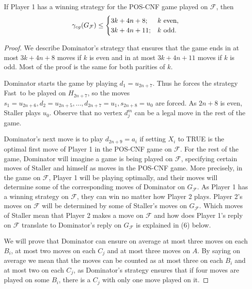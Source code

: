 \documentclass[10pt,a4paper]{amsart}
\newcommand{\F}{\mathcal{F}}
\newcommand{\fast}{{\sc Fast}}
\newcommand{\gcg}{\gamma_{\rm cg}}
\begin{document}
\begin{lemma}
	\label{lem:p1-wins}
	If Player 1 has a winning strategy for the POS-CNF game played on $\F$, then $$\gcg(G_\F) \leq \begin{cases}
		3k + 4n + 8; & k \text{ even},\\
		3k + 4n + 11; & k \text{ odd}.
	\end{cases}$$
\end{lemma}

\begin{proof}
	We describe Dominator's strategy that ensures that the game ends in at most $3k + 4n + 8$ moves if $k$ is even and in at most $3k + 4n + 11$ moves if $k$ is odd. Most of the proof is the same for both parities of $k$.
	
	Dominator starts the game by playing $d_1 = u_{2n+7}$. Thus he forces the strategy \fast\ to be played on $H_{2n+7}$, so the moves $s_1 = u_{2n+6}, d_2 = u_{2n+5}, \ldots, d_{2n+7} = u_1, s_{2n+8} = u_0$ are forced. As $2n+8$ is even, Staller plays $u_0$. Observe that no vertex $d_j^m$ can be a legal move in the rest of the game.
	
	Dominator's next move is to play $d_{2n+9} = a_i$ if setting $X_i$ to TRUE is the optimal first move of Player 1 in the POS-CNF game on $\F$. For the rest of the game, Dominator will imagine a game is being played on $\F$, specifying certain moves of Staller and himself as moves in the POS-CNF game. More precisely, in the game on $\F$, Player 1 will be playing optimally, and their moves will determine some of the corresponding moves of Dominator on $G_\F$. As Player 1 has a winning strategy on $\F$, they can win no matter how Player 2 plays. Player 2's moves on $\F$ will be determined by some of Staller's moves on $G_\F$. Which moves of Staller mean that Player 2 makes a move on $\F$ and how does Player 1's reply on $\F$ translate to Dominator's reply on $G_\F$ is explained in (6) below.
	
	We will prove that Dominator can ensure on average at most three moves on each $B_i$, at most two moves on each $C_j$ and at most three moves on $A$. By saying on average we mean that the moves can be counted as at most three on each $B_i$ and at most two on each $C_j$, as Dominator's strategy ensures that if four moves are played on some $B_i$, there is a $C_j$ with only one move played on it. 
	

\end{proof}
\end{document}
